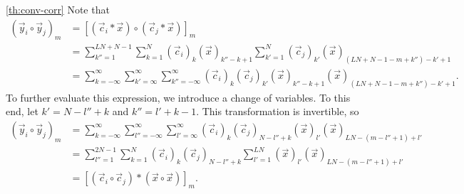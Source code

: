 \documentclass[a4paper, openany, oneside]{memoir}
\begin{document}
\begin{blockProofTheorem}{\ref{th:conv-corr}}
    Note that
    \begin{align*}
        (\vec{y}_i \circ \vec{y}_j)_m
        &= [(\vec{c}_i \ast \vec{x}) \circ (\vec{c}_j \ast \vec{x})]_m \\
        &=\sum_{k''=1}^{LN+N-1}\sum_{k=1}^N (\vec{c}_i)_k (\vec{x})_{k''-k+1}\sum_{k'=1}^{N}(\vec{c}_j)_{k'}(\vec{x})_{(LN+N-1-m+k'')-k'+1} \\
        &=\sum_{k=-\infty}^\infty\sum_{k'=\infty}^{\infty}\sum_{k''=-\infty}^{\infty} (\vec{c}_i)_k (\vec{c}_j)_{k'}(\vec{x})_{k''-k+1}(\vec{x})_{(LN+N-1-m+k'')-k'+1}.
    \end{align*}
    To further evaluate this expression, we introduce a change of variables. To this end, let $k' = N -l'' +k$ and $k'' = l' + k - 1$. This transformation is invertible, so
    \begin{align*}
        (\vec{y}_i \circ \vec{y}_j)_m
        &=\sum_{k=-\infty}^\infty\sum_{l''=-\infty}^{\infty}\sum_{l'=\infty}^{\infty} (\vec{c}_i)_k (\vec{c}_j)_{N -l'' +k}(\vec{x})_{l'}
        (\vec{x})_{LN-(m-l'' + 1)+l'} \\
        &=\sum_{l''=1}^{2N-1}\sum_{k=1}^{N}(\vec{c}_i)_k (\vec{c}_j)_{N -l'' +k}\sum_{l'=1}^{LN}(\vec{x})_{l'}
        (\vec{x})_{LN-(m-l'' + 1)+l'} \\
        &=[(\vec{c}_i \circ \vec{c}_j) \ast (\vec{x} \circ \vec{x})]_m.
    \end{align*}
\end{blockProofTheorem}
\end{document}
